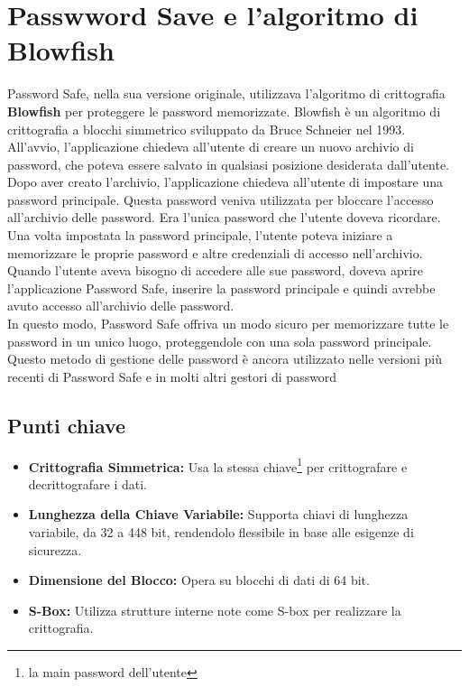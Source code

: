 \documentclass[a4paper,12pt]{report}
\begin{document}
	\section{Passwword Save e l'algoritmo di Blowfish}
	Password Safe, nella sua versione originale, utilizzava l'algoritmo di
	crittografia \textbf{Blowfish} per proteggere le password memorizzate.
	Blowfish è un algoritmo di crittografia a blocchi simmetrico sviluppato da
	Bruce Schneier nel 1993.\\
	All'avvio, l'applicazione chiedeva all'utente di creare un nuovo archivio di
	password, che poteva essere salvato in qualsiasi posizione desiderata
	dall'utente. Dopo aver creato l'archivio, l'applicazione chiedeva all'utente di
	impostare una password principale. Questa password veniva utilizzata per
	bloccare l'accesso all'archivio delle password. Era l'unica password che
	l'utente doveva ricordare.\\
	Una volta impostata la password principale, l'utente poteva iniziare a
	memorizzare le proprie password e altre credenziali di accesso nell'archivio.
	Quando l'utente aveva bisogno di accedere alle sue password, doveva aprire
	l'applicazione Password Safe, inserire la password principale e quindi avrebbe
	avuto accesso all'archivio delle password.\\
	In questo modo, Password Safe offriva un modo sicuro per memorizzare tutte le
	password in un unico luogo, proteggendole con una sola password principale.
	Questo metodo di gestione delle password è ancora utilizzato nelle versioni più
	recenti di Password Safe e in molti altri gestori di password
	\subsection*{Punti chiave}
	\begin{itemize}
		\item \textbf{Crittografia Simmetrica:} Usa la stessa chiave\footnote{ la main password dell'utente} per
		crittografare e decrittografare i dati.
		\item \textbf{Lunghezza della Chiave Variabile:} Supporta chiavi di
		lunghezza variabile, da 32 a 448 bit, rendendolo flessibile in base alle
		esigenze di sicurezza.
		\item \textbf{Dimensione del Blocco:} Opera su blocchi di dati di 64
		bit.
		\item \textbf{S-Box:} Utilizza strutture interne note come
		S-box per realizzare la crittografia.
	\end{itemize}
	\newpage
\end{document}
